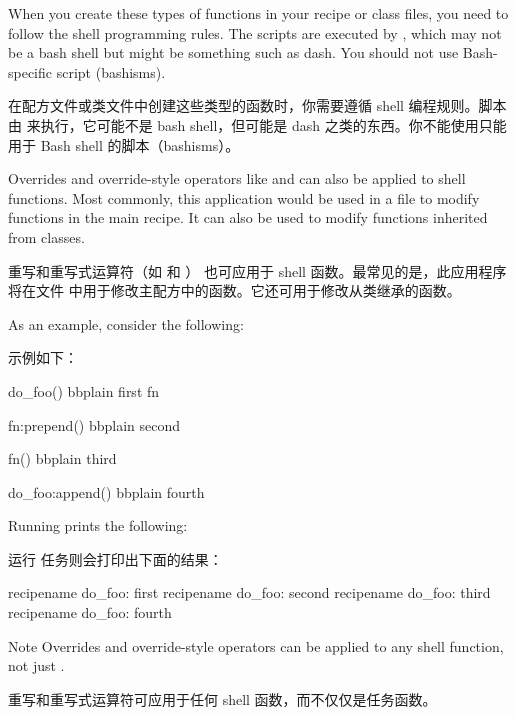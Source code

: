 When you create these types of functions in your recipe or class files, you need to follow the shell programming rules. The scripts are executed by , which may not be a bash shell but might be something such as dash. You should not use Bash-specific script (bashisms).

在配方文件或类文件中创建这些类型的函数时，你需要遵循 shell 编程规则。脚本由  来执行，它可能不是 bash shell，但可能是 dash 之类的东西。你不能使用只能用于 Bash shell 的脚本（bashisms）\footnotemark[1]。


Overrides and override-style operators like  and  can also be applied to shell functions. Most commonly, this application would be used in a  file to modify functions in the main recipe. It can also be used to modify functions inherited from classes.

重写和重写式运算符（如 和 ） 也可应用于 shell 函数。最常见的是，此应用程序将在文件  中用于修改主配方中的函数。它还可用于修改从类继承的函数。

As an example, consider the following:

示例如下：

\begin{pyglist}
do_foo() {
    bbplain first
    fn
}

fn:prepend() {
    bbplain second
}

fn() {
    bbplain third
}

do_foo:append() {
    bbplain fourth
}
\end{pyglist}

Running  prints the following:

运行 任务则会打印出下面的结果：

\begin{pyglist}
recipename do_foo: first
recipename do_foo: second
recipename do_foo: third
recipename do_foo: fourth
\end{pyglist}

\begin{noteblock}{Note}%
Overrides and override-style operators can be applied to any shell function, not just .

\medskip
重写和重写式运算符可应用于任何 shell 函数，而不仅仅是任务函数。
\end{noteblock}

